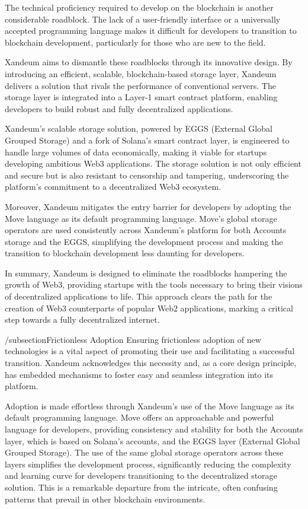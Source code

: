 \documentclass[11pt]{article}   	%
\begin{document}
The technical proficiency required to develop on the blockchain is another considerable roadblock. The lack of a user-friendly interface or a universally accepted programming language makes it difficult for developers to transition to blockchain development, particularly for those who are new to the field.

Xandeum aims to dismantle these roadblocks through its innovative design. By introducing an efficient, scalable, blockchain-based storage layer, Xandeum delivers a solution that rivals the performance of conventional servers. The storage layer is integrated into a Layer-1 smart contract platform, enabling developers to build robust and fully decentralized applications.

Xandeum's scalable storage solution, powered by EGGS (External Global Grouped Storage) and a fork of Solana's smart contract layer, is engineered to handle large volumes of data economically, making it viable for startups developing ambitious Web3 applications. The storage solution is not only efficient and secure but is also resistant to censorship and tampering, underscoring the platform's commitment to a decentralized Web3 ecosystem.

Moreover, Xandeum mitigates the entry barrier for developers by adopting the Move language as its default programming language. Move's global storage operators are used consistently across Xandeum's platform for both Accounts storage and the EGGS, simplifying the development process and making the transition to blockchain development less daunting for developers.

In summary, Xandeum is designed to eliminate the roadblocks hampering the growth of Web3, providing startups with the tools necessary to bring their visions of decentralized applications to life. This approach clears the path for the creation of Web3 counterparts of popular Web2 applications, marking a critical step towards a fully decentralized internet.

/subsection{Frictionless Adoption}
Ensuring frictionless adoption of new technologies is a vital aspect of promoting their use and facilitating a successful transition. Xandeum acknowledges this necessity and, as a core design principle, has embedded mechanisms to foster easy and seamless integration into its platform.

Adoption is made effortless through Xandeum's use of the Move language as its default programming language. Move offers an approachable and powerful language for developers, providing consistency and stability for both the Accounts layer, which is based on Solana's accounts, and the EGGS layer (External Global Grouped Storage). The use of the same global storage operators across these layers simplifies the development process, significantly reducing the complexity and learning curve for developers transitioning to the decentralized storage solution. This is a remarkable departure from the intricate, often confusing patterns that prevail in other blockchain environments.
\end{document}
